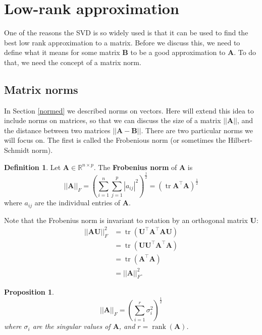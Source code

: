 \documentclass[
]{book}
\newtheorem{proposition}{Proposition}[chapter]
\theoremstyle{definition}
\newtheorem{definition}{Definition}[chapter]
\theoremstyle{definition}
\theoremstyle{definition}
\theoremstyle{definition}
\theoremstyle{remark}
\begin{document}
\section{Low-rank approximation}\label{lowrank}

One of the reasons the SVD is so widely used is that it can be used to find the best low rank approximation to a matrix. Before we discuss this, we need to define what it means for some matrix \(\mathbf B\) to be a good approximation to \(\mathbf A\). To do that, we need the concept of a matrix norm.

\subsection{Matrix norms}\label{matrix-norms}

In Section \ref{normed} we described norms on vectors. Here will extend this idea to include norms on matrices, so that we can discuss the size of a matrix \(||\mathbf A||\), and the distance between two matrices \(||\mathbf A-\mathbf B||\). There are two particular norms we will focus on. The first is called the Frobenious norm (or sometimes the Hilbert-Schmidt norm).

\begin{definition}
\protect\hypertarget{def:frobenius}{}\label{def:frobenius}Let \(\mathbf A\in \mathbb{R}^{n\times p}\). The \textbf{Frobenius norm} of \(\mathbf A\) is
\[||\mathbf A||_F = \left(\sum_{i=1}^n\sum_{j=1}^p |a_{ij}|^2\right)^{\frac{1}{2}}=(\operatorname{tr}\mathbf A^\top\mathbf A)^{\frac{1}{2}}  
\]
where \(a_{ij}\) are the individual entries of \(\mathbf A\).
\end{definition}

Note that the Frobenius norm is invariant to rotation by an orthogonal matrix \(\mathbf U\):
\begin{align*}
 ||\mathbf A\mathbf U||_F^2 &= \operatorname{tr}(\mathbf U^\top \mathbf A^\top \mathbf A\mathbf U)\\
 &=\operatorname{tr}(\mathbf U\mathbf U^\top \mathbf A^\top \mathbf A)\\
 &= \operatorname{tr}(\mathbf A^\top\mathbf A)\\
 &= ||\mathbf A||_F^2.
\end{align*}

\begin{proposition}
\protect\hypertarget{prp:frob}{}\label{prp:frob}\[||\mathbf A||_F = \left(\sum_{i=1}^r \sigma_i^2\right)^{\frac{1}{2}}\]
where \(\sigma_i\) are the singular values of \(\mathbf A\), and \(r = \operatorname{rank}(\mathbf A)\).
\end{proposition}
\end{document}
